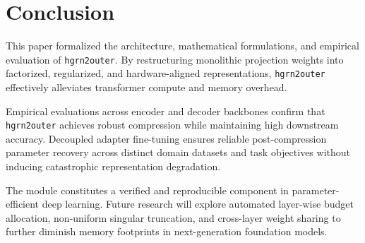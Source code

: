 \section{Conclusion}
This paper formalized the architecture, mathematical formulations, and empirical evaluation of \texttt{hgrn2outer}. By restructuring monolithic projection weights into factorized, regularized, and hardware-aligned representations, \texttt{hgrn2outer} effectively alleviates transformer compute and memory overhead.

Empirical evaluations across encoder and decoder backbones confirm that \texttt{hgrn2outer} achieves robust compression while maintaining high downstream accuracy. Decoupled adapter fine-tuning ensures reliable post-compression parameter recovery across distinct domain datasets and task objectives without inducing catastrophic representation degradation.

The module constitutes a verified and reproducible component in parameter-efficient deep learning. Future research will explore automated layer-wise budget allocation, non-uniform singular truncation, and cross-layer weight sharing to further diminish memory footprints in next-generation foundation models.

